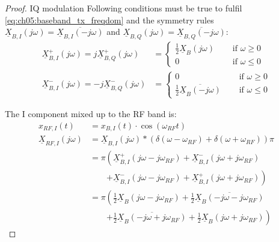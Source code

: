 \begin{refsection}
\begin{proof}{IQ modulation}
	Following conditions must be true to fulfil \eqref{eq:ch05:baseband_tx_freqdom} and the symmetry rules $\underline{X}_{B,I}\left(j\omega\right) = \overline{\underline{X}_{B,I}\left(-j\omega\right)}$ and $\underline{X}_{B,Q}\left(j\omega\right) = \overline{\underline{X}_{B,Q}\left(-j\omega\right)}$:
	\begin{subequations}
		\begin{align}
			\underline{X}_{B,I}^{+}\left(j\omega\right) = j \underline{X}_{B,Q}^{+}\left(j\omega\right) &= \begin{cases}
				\frac{1}{2} \underline{X}_{B}\left(j\omega\right) & \quad \text{ if } \omega \geq 0 \\
				0 & \quad \text{ if } \omega \leq 0
			\end{cases} \\
			\underline{X}_{B,I}^{-}\left(j\omega\right) = -j \underline{X}_{B,Q}^{-}\left(j\omega\right) &= \begin{cases}
				0 & \quad \text{ if } \omega \geq 0 \\
				\frac{1}{2} \overline{\underline{X}_{B}\left(-j\omega\right)} & \quad \text{ if } \omega \leq 0
			\end{cases}
		\end{align}
	\end{subequations}

	The \ac{I} component mixed up to the \ac{RF} band is:
	\begin{equation}
		\begin{split}
			x_{RF,I}(t) &= x_{B,I}(t) \cdot \cos\left(\omega_{RF} t\right) \\
			\underline{X}_{RF,I}\left(j\omega\right) &= \underline{X}_{B,I}\left(j\omega\right) * \left(\delta\left(\omega-\omega_{RF}\right) + \delta\left(\omega+\omega_{RF}\right)\right) \pi \\
			 &= \pi \left(\underline{X}_{B,I}^{+}\left(j\omega-j\omega_{RF}\right) + \underline{X}_{B,I}^{-}\left(j\omega+j\omega_{RF}\right)\right. \\ &\qquad \left. + \underline{X}_{B,I}^{-}\left(j\omega-j\omega_{RF}\right) + \underline{X}_{B,I}^{+}\left(j\omega+j\omega_{RF}\right)\right) \\
			 &= \pi \left(\frac{1}{2} \underline{X}_{B}\left(j\omega-j\omega_{RF}\right) + \frac{1}{2} \overline{\underline{X}_{B}\left(-j\omega-j\omega_{RF}\right)}\right. \\ &\qquad \left. + \frac{1}{2} \overline{\underline{X}_{B}\left(-j\omega+j\omega_{RF}\right)} + \frac{1}{2} \underline{X}_{B}\left(j\omega+j\omega_{RF}\right)\right)
		\end{split}
	\end{equation}
	

\end{proof}
\end{refsection}

